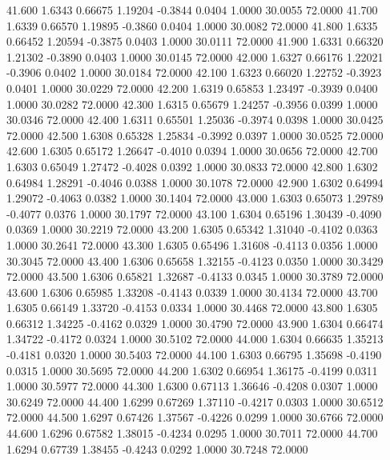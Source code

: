   41.600   1.6343   0.66675   1.19204  -0.3844   0.0404   1.0000  30.0055  72.0000
  41.700   1.6339   0.66570   1.19895  -0.3860   0.0404   1.0000  30.0082  72.0000
  41.800   1.6335   0.66452   1.20594  -0.3875   0.0403   1.0000  30.0111  72.0000
  41.900   1.6331   0.66320   1.21302  -0.3890   0.0403   1.0000  30.0145  72.0000
  42.000   1.6327   0.66176   1.22021  -0.3906   0.0402   1.0000  30.0184  72.0000
  42.100   1.6323   0.66020   1.22752  -0.3923   0.0401   1.0000  30.0229  72.0000
  42.200   1.6319   0.65853   1.23497  -0.3939   0.0400   1.0000  30.0282  72.0000
  42.300   1.6315   0.65679   1.24257  -0.3956   0.0399   1.0000  30.0346  72.0000
  42.400   1.6311   0.65501   1.25036  -0.3974   0.0398   1.0000  30.0425  72.0000
  42.500   1.6308   0.65328   1.25834  -0.3992   0.0397   1.0000  30.0525  72.0000
  42.600   1.6305   0.65172   1.26647  -0.4010   0.0394   1.0000  30.0656  72.0000
  42.700   1.6303   0.65049   1.27472  -0.4028   0.0392   1.0000  30.0833  72.0000
  42.800   1.6302   0.64984   1.28291  -0.4046   0.0388   1.0000  30.1078  72.0000
  42.900   1.6302   0.64994   1.29072  -0.4063   0.0382   1.0000  30.1404  72.0000
  43.000   1.6303   0.65073   1.29789  -0.4077   0.0376   1.0000  30.1797  72.0000
  43.100   1.6304   0.65196   1.30439  -0.4090   0.0369   1.0000  30.2219  72.0000
  43.200   1.6305   0.65342   1.31040  -0.4102   0.0363   1.0000  30.2641  72.0000
  43.300   1.6305   0.65496   1.31608  -0.4113   0.0356   1.0000  30.3045  72.0000
  43.400   1.6306   0.65658   1.32155  -0.4123   0.0350   1.0000  30.3429  72.0000
  43.500   1.6306   0.65821   1.32687  -0.4133   0.0345   1.0000  30.3789  72.0000
  43.600   1.6306   0.65985   1.33208  -0.4143   0.0339   1.0000  30.4134  72.0000
  43.700   1.6305   0.66149   1.33720  -0.4153   0.0334   1.0000  30.4468  72.0000
  43.800   1.6305   0.66312   1.34225  -0.4162   0.0329   1.0000  30.4790  72.0000
  43.900   1.6304   0.66474   1.34722  -0.4172   0.0324   1.0000  30.5102  72.0000
  44.000   1.6304   0.66635   1.35213  -0.4181   0.0320   1.0000  30.5403  72.0000
  44.100   1.6303   0.66795   1.35698  -0.4190   0.0315   1.0000  30.5695  72.0000
  44.200   1.6302   0.66954   1.36175  -0.4199   0.0311   1.0000  30.5977  72.0000
  44.300   1.6300   0.67113   1.36646  -0.4208   0.0307   1.0000  30.6249  72.0000
  44.400   1.6299   0.67269   1.37110  -0.4217   0.0303   1.0000  30.6512  72.0000
  44.500   1.6297   0.67426   1.37567  -0.4226   0.0299   1.0000  30.6766  72.0000
  44.600   1.6296   0.67582   1.38015  -0.4234   0.0295   1.0000  30.7011  72.0000
  44.700   1.6294   0.67739   1.38455  -0.4243   0.0292   1.0000  30.7248  72.0000
